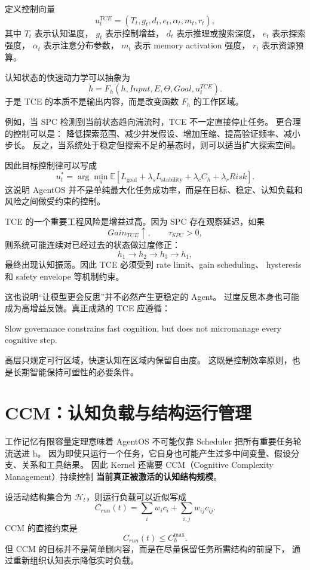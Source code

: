 定义控制向量
\[
u_t^{TCE}
=
(
T_t,
g_t,
d_t,
e_t,
\alpha_t,
m_t,
r_t
),
\]
其中 $T_t$ 表示认知温度，
$g_t$ 表示控制增益，
$d_t$ 表示推理或搜索深度，
$e_t$ 表示探索强度，
$\alpha_t$ 表示注意分布参数，
$m_t$ 表示 memory activation 强度，
$r_t$ 表示资源预算。

认知状态的快速动力学可以抽象为
\[
\dot h
=
F_h(
h,
Input,
E,
\Theta,
Goal,
u_t^{TCE}
).
\]
于是 TCE 的本质不是输出内容，而是改变函数 $F_h$ 的工作区域。

例如，当 SPC 检测到当前状态趋向湍流时，TCE 不一定直接停止任务。
更合理的控制可以是：
降低探索范围、减少并发假设、增加压缩、提高验证频率、减小步长。
反之，当系统处于稳定但搜索不足的基态时，则可以适当扩大探索空间。

因此目标控制律可以写成
\[
u_t^\ast
=
\arg\min_u
\mathbb E
\left[
L_{\mathrm{goal}}
+
\lambda_s L_{\mathrm{stability}}
+
\lambda_c C_h
+
\lambda_r Risk
\right].
\]
这说明 AgentOS 并不是单纯最大化任务成功率，而是在目标、稳定、认知负载和风险之间做受约束的控制。

TCE 的一个重要工程风险是增益过高。因为 SPC 存在观察延迟，如果
\[
Gain_{TCE}\uparrow,
\qquad
\tau_{SPC}>0,
\]
则系统可能连续对已经过去的状态做过度修正：
\[
h_1\rightarrow h_2\rightarrow h_3\rightarrow h_1,
\]
最终出现认知振荡。因此 TCE 必须受到 rate limit、gain scheduling、
hysteresis 和 safety envelope 等机制约束。

这也说明``让模型更会反思''并不必然产生更稳定的 Agent。
过度反思本身也可能成为高增益反馈。真正成熟的 TCE 应遵循：
\begin{statementbox}
Slow governance constrains fast cognition,
but does not micromanage every cognitive step.
\end{statementbox}
高层只规定可行区域，快速认知在区域内保留自由度。
这既是控制效率原则，也是长期智能保持可塑性的必要条件。


\section{CCM：认知负载与结构运行管理}

工作记忆有限容量定理意味着 AgentOS 不可能仅靠 Scheduler 把所有重要任务轮流送进 h。
因为即使只运行一个任务，它自身也可能产生过多中间变量、假设分支、关系和工具结果。
因此 Kernel 还需要 CCM（Cognitive Complexity Management）持续控制
\textbf{当前真正被激活的认知结构规模}。

设活动结构集合为 $\mathcal H_t$，则运行负载可以近似写成
\[
C_{run}(t)
=
\sum_i w_i c_i
+
\sum_{i,j}w_{ij}c_{ij}.
\]
CCM 的直接约束是
\[
\boxed{
C_{run}(t)\leq C_h^{\max}.
}
\]
但 CCM 的目标并不是简单删内容，而是在尽量保留任务所需结构的前提下，
通过重新组织认知表示降低实时负载。

